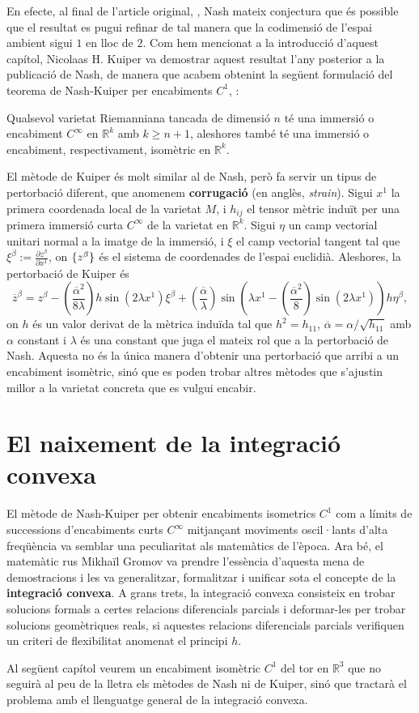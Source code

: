 En efecte, al final de l'article original, \cite{nash1954}, Nash mateix conjectura que és possible que el resultat es pugui refinar de tal manera que la codimensió de l'espai ambient sigui $1$ en lloc de $2$. Com hem mencionat a la introducció d'aquest capítol, Nicolaas H. Kuiper va demostrar aquest resultat l'any posterior a la publicació de Nash, de manera que acabem obtenint la següent formulació del teorema de Nash-Kuiper per encabiments $C^1$, \cite{kuiper1955}:

\begin{teo}
    Qualsevol varietat Riemanniana tancada de dimensió $n$ té una immersió o encabiment $C^\infty$ en $\mathbb R^k$ amb $k\ge n+1$, aleshores també té una immersió o encabiment, respectivament, isomètric en $\mathbb R^k$.
\end{teo}

El mètode de Kuiper és molt similar al de Nash, però fa servir un tipus de pertorbació diferent, que anomenem \textbf{corrugació} (en anglès, \textit{strain}). Sigui $x^1$ la primera coordenada local de la varietat $M$, i $h_{ij}$ el tensor mètric induït per una primera immersió curta $C^\infty$ de la varietat en $\mathbb R^k$. Sigui $\eta$ un camp vectorial unitari normal a la imatge de la immersió, i $\xi$ el camp vectorial tangent tal que $\xi^\beta := \frac{\partial z^\beta}{\partial x^1}$, on $\{z^\beta\}$ és el sistema de coordenades de l'espai euclidià. Aleshores, la pertorbació de Kuiper és
\begin{equation*}
    \boxed{
        \overline{z}^\beta = z^\beta - \left(\frac{\overline \alpha^2}{8\lambda}\right)h\sin\left(2\lambda x^1\right)\xi^\beta + \left(\frac{\overline\alpha}{\lambda}\right)\sin\left(\lambda x^1 - \left(\frac{\overline\alpha ^2}{8}\right)\sin\left(2\lambda x^1\right)\right)h\eta^\beta,
        }
\end{equation*}
on $h$ és un valor derivat de la mètrica induïda tal que $h^2 = h_{11}$, $\overline\alpha = \alpha / \sqrt{h_{11}}$ amb $\alpha$ constant i  $\lambda$ és una constant que juga el mateix rol que a la pertorbació de Nash. Aquesta no és la única manera d'obtenir una pertorbació que arribi a un encabiment isomètric, sinó que es poden trobar altres mètodes que s'ajustin millor a la varietat concreta que es vulgui encabir.
\section{El naixement de la integració convexa}
El mètode de Nash-Kuiper per obtenir encabiments isometrics $C^1$ com a límits de successions d'encabiments curts $C^\infty$ mitjançant moviments oscil·lants d'alta freqüència va semblar una peculiaritat als matemàtics de l'època. Ara bé, el matemàtic rus Mikhaïl Gromov va prendre l'essència d'aquesta mena de demostracions i les va generalitzar, formalitzar i unificar sota el concepte de la \textbf{integració convexa}. A grans trets, la integració convexa consisteix en trobar solucions formals a certes relacions diferencials parcials i deformar-les per trobar solucions geomètriques reals, si aquestes relacions diferencials parcials verifiquen un criteri de flexibilitat anomenat el principi $h$.

Al següent capítol veurem un encabiment isomètric $C^1$ del tor en $\mathbb R^3$ que no seguirà al peu de la lletra els mètodes de Nash ni de Kuiper, sinó que tractarà el problema amb el llenguatge general de la integració convexa. 